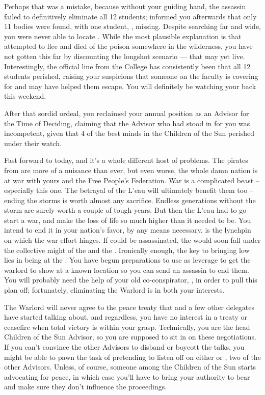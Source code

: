 \documentclass[char]{GL2020}
\begin{document}
Perhaps that was a mistake, because without your guiding hand, the assassin failed to definitively eliminate all 12 students; \cDiplomat{} informed you afterwards that only 11 bodies were found, with one student, \cKidScientist{\full}, missing. Despite searching far and wide, you were never able to locate \cKidScientist{\them}. While the most plausible explanation is that  attempted to flee and died of the poison somewhere in the wilderness, you have not gotten this far by discounting the longshot scenario — that \cKidScientist{} may yet live. Interestingly, the official line from the College has consistently been that all 12 students perished, raising your suspicions that someone on the faculty is covering for \cKidScientist{} and may have helped them escape. You will definitely be watching your back this weekend. 

After that sordid ordeal, you reclaimed your annual position as an Advisor for the Time of Deciding, claiming that the Advisor who had stood in for you was incompetent, given that 4 of the best minds in the Children of the Sun perished under their watch.

Fast forward to today, and it's a whole different host of problems. The pirates from \pShip{} are more of a nuisance than ever, but even worse, the whole damn nation is at war with yours and the Free People's Federation. War is a complicated beast – especially this one. The betrayal of the L'eau will ultimately benefit them too – ending the storms is worth almost any sacrifice. Endless generations without the storm are surely worth a couple of tough years. But then the L'eau had to go start a war, and make the loss of life so much higher than it needed to be. You intend to end it in your nation's favor, by any means necessary. \cLoud{\full} is the lynchpin on which the \pShip{} war effort hinges. If \cLoud{\they} could be assassinated, the \pShip{} would soon fall under the collective might of the \pFarm{} and the \pTech{}. Ironically enough, the key to bringing \cLoud{} low lies in \cLoud{\their} \cWarlordDaughter{\child} being at the \pSchool{}. You have begun preparations to use \cWarlordDaughter{\them} as leverage to get the warlord to show \cLoud{\themself} at a known location so you can send an assassin to end them. You will probably need the help of your old co-conspirator, \cDiplomat{}, in order to pull this plan off; fortunately, eliminating the Warlord is in both your interests.

The Warlord will never agree to the peace treaty that \cHeadDiplomat{} and a few other delegates have started talking about, and regardless, you have no interest in a treaty or ceasefire when total victory is within your grasp. Technically, you are the head Children of the Sun Advisor, so you are supposed to sit in on these negotiations. If you can't convince the other Advisors to disband or boycott the talks, you might be able to pawn the task of pretending to listen off on either \cWildCard{\full} or \cHedonist{\full}, two of the other Advisors. Unless, of course, someone among the Children of the Sun starts advocating for peace, in which case you'll have to bring your authority to bear and make sure they don't influence the proceedings.
\end{document}
